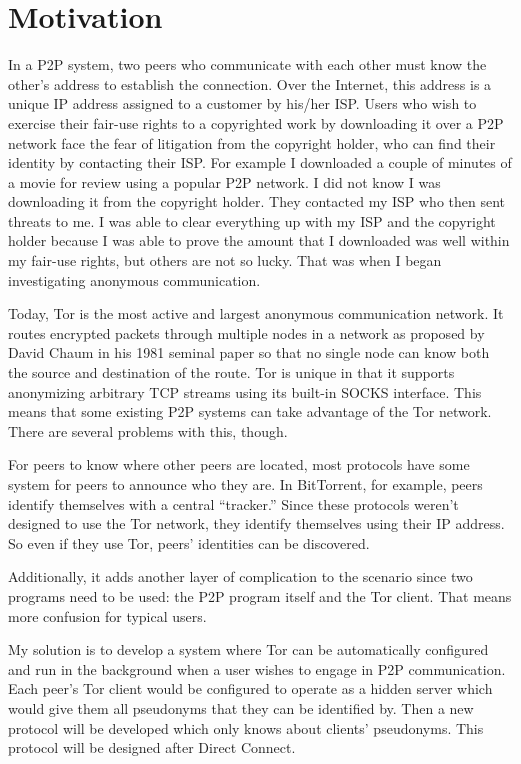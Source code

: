 \documentclass[12pt]{article}
\begin{document}
\section{Motivation}
In a P2P system, two peers who communicate with each other must know the other's address to establish the connection.  Over the Internet, this address is a unique IP address assigned to a customer by his/her ISP.  Users who wish to exercise their fair-use rights to a copyrighted work by downloading it over a P2P network face the fear of litigation from the copyright holder, who can find their identity by contacting their ISP.  For example I downloaded a couple of minutes of a movie for review using a popular P2P network.  I did not know I was downloading it from the copyright holder.  They contacted my ISP who then sent threats to me.  I was able to clear everything up with my ISP and the copyright holder because I was able to prove the amount that I downloaded was well within my fair-use rights, but others are not so lucky.  That was when I began investigating anonymous communication.

Today, Tor is the most active and largest anonymous communication network.  It routes encrypted packets through multiple nodes in a network as proposed by David Chaum in his 1981 seminal paper so that no single node can know both the source and destination of the route.  Tor is unique in that it supports anonymizing arbitrary TCP streams using its built-in SOCKS interface.  This means that some existing P2P systems can take advantage of the Tor network.  There are several problems with this, though.

For peers to know where other peers are located, most protocols have some system for peers to announce who they are.  In BitTorrent, for example, peers identify themselves with a central ``tracker.''  Since these protocols weren't designed to use the Tor network, they identify themselves using their IP address.  So even if they use Tor, peers' identities can be discovered.

Additionally, it adds another layer of complication to the scenario since two programs need to be used: the P2P program itself and the Tor client.  That means more confusion for typical users.

My solution is to develop a system where Tor can be automatically configured and run in the background when a user wishes to engage in P2P communication.  Each peer's Tor client would be configured to operate as a hidden server which would give them all pseudonyms that they can be identified by.  Then a new protocol will be developed which only knows about clients' pseudonyms.  This protocol will be designed after Direct Connect.
\end{document}
